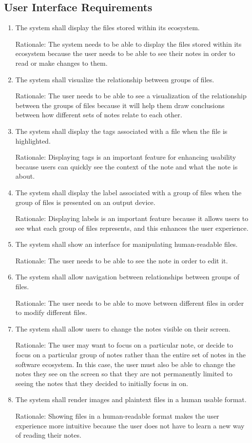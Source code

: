 \documentclass{article}
\begin{document}
\subsection{User Interface Requirements}
\begin{enumerate}[U{I}R1]
    \item The system shall display the files stored within its ecosystem.

	Rationale: The system needs to be able to display the files stored within its ecosystem because the user needs to be able to see their notes in order to read or make changes to them.
    \item The system shall visualize the relationship between groups of files.

	Rationale: The user needs to be able to see a visualization of the relationship between the groups of files because it will help them draw conclusions between how different sets of notes relate to each other.
	\item The system shall display the tags associated with a file when the file is highlighted.

	Rationale: Displaying tags is an important feature for enhancing usability because users can quickly see the context of the note and what the note is about.
	\item The system shall display the label associated with a group of files when the group of files is presented on an output device.

	Rationale: Displaying labels is an important feature because it allows users to see what each group of files represents, and this enhances the user experience.
    \item The system shall show an interface for manipulating human-readable files.

	Rationale: The user needs to be able to see the note in order to edit it.
    \item The system shall allow navigation between relationships between groups of files.

	Rationale: The user needs to be able to move between different files in order to modify different files.
    \item The system shall allow users to change the notes visible on their screen.

	Rationale: The user may want to focus on a particular note, or decide to focus on a particular group of notes rather than the entire set of notes in the software ecosystem. In this case, the user must also be able to change the notes they see on the screen so that they are not permanently limited to seeing the notes that they decided to initially focus in on.

    \item The system shall render images and plaintext files in a human usable format.

	Rationale: Showing files in a human-readable format makes the user experience more intuitive because the user does not have to learn a new way of reading their notes.
\end{enumerate}
\end{document}
